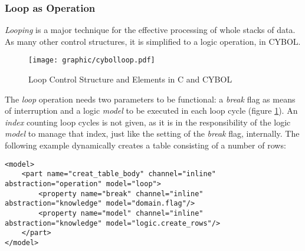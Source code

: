 %
%
%
%
%
%
%

\subsubsection{Loop as Operation}
\label{loop_as_operation_heading}

\emph{Looping} is a major technique for the effective processing of whole
stacks of data. As many other control structures, it is simplified to a logic
operation, in CYBOL.

\begin{figure}[ht]
    \begin{center}
        \texttt{[image: graphic/cybolloop.pdf]}
        \caption{Loop Control Structure and Elements in C and CYBOL}
        \label{cybolloop_figure}
    \end{center}
\end{figure}

The \emph{loop} operation needs two parameters to be functional: a \emph{break}
flag as means of interruption and a logic \emph{model} to be executed in each
loop cycle (figure \ref{cybolloop_figure}). An \emph{index} counting loop
cycles is not given, as it is in the responsibility of the logic \emph{model}
to manage that index, just like the setting of the \emph{break} flag,
internally. The following example dynamically creates a table consisting of a
number of rows:

\begin{scriptsize}
    \begin{verbatim}
<model>
    <part name="creat_table_body" channel="inline" abstraction="operation" model="loop">
        <property name="break" channel="inline" abstraction="knowledge" model="domain.flag"/>
        <property name="model" channel="inline" abstraction="knowledge" model="logic.create_rows"/>
    </part>
</model>
    \end{verbatim}
\end{scriptsize}
